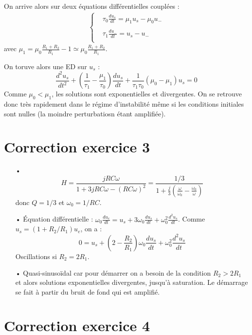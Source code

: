 \documentclass{report}
\begin{document}
On arrive alors sur deux équations différentielles couplées :
\begin{align*}
	\left\lbrace
\begin{array}{cc}
	& \tau_0\frac{du_s}{dt} = \mu_1u_s - \mu_0u_- \\
	&  \\
	&\tau_1\frac{du_-}{dt} = u_s - u_-  \\
\end{array}\right.
\end{align*}
avec $\mu_1=\mu_0\frac{R_1+R_2}{R_1}-1\simeq\mu_0\frac{R_1+R_2}{R_1}$.

On toruve alors une ED sur $u_s$ :
\begin{equation}
	\frac{d^2u_s}{dt^2} +\left( \frac{1}{\tau_1}-\frac{\mu_1}{\tau_0}\right) \frac{du_s}{dt} + \frac{1}{\tau_1\tau_0}\left(\mu_0-\mu_1\right)u_s=0
\end{equation}
Comme $\mu_0<\mu_1$, les solutions sont exponentielles et divergentes. On se retrouve donc très rapidement dans le régime d'instabilité même si les conditions initiales sont nulles (la moindre perturbatiosn étant amplifiée).
\section*{Correction exercice 3}

\begin{itemize}
	\item[•]
	\begin{equation}
		H=\frac{jRC\omega}{1+3jRC\omega-(RC\omega)^2}=\frac{1/3}{1+\frac{j}{3}\left( \frac{\omega}{\omega_0}-\frac{\omega_0}{\omega}\right) }
	\end{equation}
	donc $Q=1/3$ et $\omega_0=1/RC$.
	\item[•] Équation différentielle : $\omega_0\frac{du_e}{dt}=u_s+3\omega_0\frac{du_s}{dt}+\omega_0^2\frac{d^2u_s}{dt}$. Comme $u_s = (1+R_2/R_1)u_e$, on a :
	\begin{equation}
	0=u_s+\left( 2-\frac{R_2}{R_1}\right) \omega_0\frac{du_s}{dt}+\omega_0^2\frac{d^2u_s}{dt}
	\end{equation}
	Oscillations si $R_2=2R_1$.
	\item[•] Quasi-sinusoïdal car pour démarrer on a besoin de la condition $R_2>2R_1$ et alors solutions exponentielles divergentes, jusqu'à saturation. Le démarrage se fait à partir du bruit de fond qui est amplifié. 
\end{itemize}

\section*{Correction exercice 4}
\end{document}
